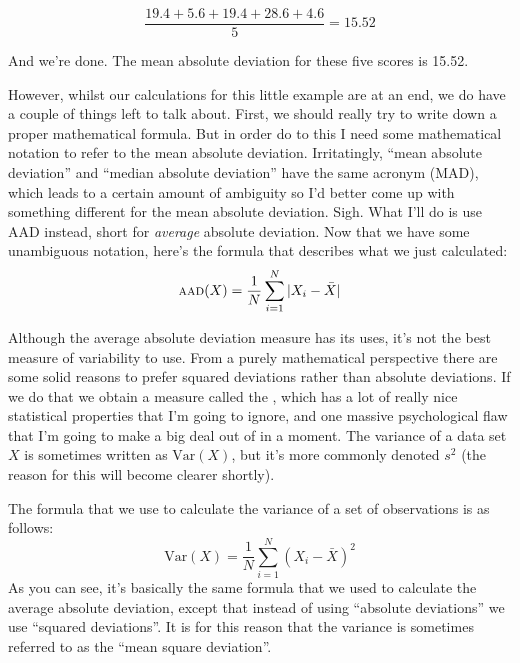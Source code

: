 $$
\frac{19.4 + 5.6 + 19.4 + 28.6 + 4.6}{5} = 15.52
$$

\noindent
And we're done. The mean absolute deviation for these five scores is 15.52. 

\vspace{0.5cm}
\begin{mdframed}[style=MyFrame,nobreak=true]
However, whilst our calculations for this little example are at an end, we do have a couple of things left to talk about. First, we should really try to write down a proper mathematical formula. But in order do to this I need some mathematical notation to refer to the mean absolute deviation. Irritatingly, ``mean absolute deviation'' and ``median absolute deviation'' have the same acronym (MAD), which leads to a certain amount of ambiguity so I'd better come up with something different for the mean absolute deviation. Sigh. What I'll do is use AAD instead, short for {\it average} absolute deviation. Now that we have some unambiguous notation, here's the formula that describes what we just calculated:
$$
\mbox{\textsc{aad}}(X) = \frac{1}{N} \sum_{i = 1}^N |X_i - \bar{X}|
$$
\end{mdframed}


Although the average absolute deviation measure has its uses, it's not the best measure of variability to use. From a purely mathematical perspective there are some solid reasons to prefer squared deviations rather than absolute deviations. If we do that we obtain a measure called the , which has a lot of really nice statistical properties that I'm going to ignore, and one massive psychological flaw that I'm going to make a big deal out of in a moment. The variance of a data set $X$ is sometimes written as $\mbox{Var}(X)$, but it's more commonly denoted $s^2$ (the reason for this will become clearer shortly). 

\vspace{0.5cm}
\begin{mdframed}[style=MyFrame,nobreak=true]
The formula that we use to calculate the variance of a set of observations is as follows:
$$
\mbox{Var}(X) = \frac{1}{N} \sum_{i=1}^N \left( X_i - \bar{X} \right)^2
$$
As you can see, it's basically the same formula that we used to calculate the average absolute deviation, except that instead of using ``absolute deviations'' we use ``squared deviations''. It is for this reason that the variance is sometimes referred to as the ``mean square deviation''.
\end{mdframed}

